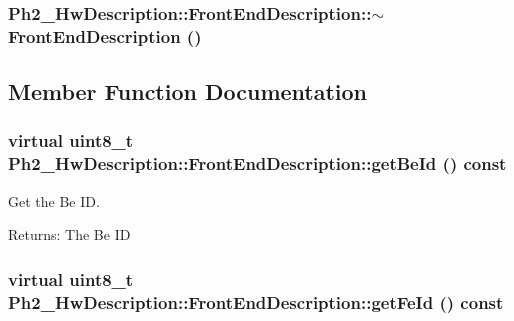 \hypertarget{class_ph2___hw_description_1_1_front_end_description_8ff5e1dc9dc09e6db9c105a362000e89}{
\subsubsection[$\sim$FrontEndDescription]{\setlength{\rightskip}{0pt plus 5cm}Ph2\_\-Hw\-Description::Front\-End\-Description::$\sim$Front\-End\-Description ()}}
\label{class_ph2___hw_description_1_1_front_end_description_8ff5e1dc9dc09e6db9c105a362000e89}




\subsection{Member Function Documentation}
\hypertarget{class_ph2___hw_description_1_1_front_end_description_093089d617b1a7d4f0b3bf8a83d2eddf}{
\subsubsection[getBeId]{\setlength{\rightskip}{0pt plus 5cm}virtual uint8\_\-t Ph2\_\-Hw\-Description::Front\-End\-Description::get\-Be\-Id () const}}
\label{class_ph2___hw_description_1_1_front_end_description_093089d617b1a7d4f0b3bf8a83d2eddf}


Get the Be ID. 

\begin{Desc}
\item[Returns:]The Be ID \end{Desc}
\hypertarget{class_ph2___hw_description_1_1_front_end_description_e929f2f3d2d8f785506a51e0d9cf44dd}{
\subsubsection[getFeId]{\setlength{\rightskip}{0pt plus 5cm}virtual uint8\_\-t Ph2\_\-Hw\-Description::Front\-End\-Description::get\-Fe\-Id () const}}
\label{class_ph2___hw_description_1_1_front_end_description_e929f2f3d2d8f785506a51e0d9cf44dd}


